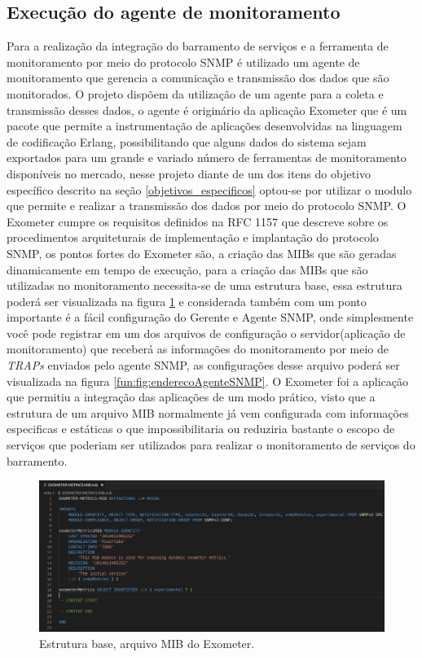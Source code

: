 \subsection{Execução do agente de monitoramento}

Para a realização da integração do barramento de serviços e a ferramenta de monitoramento por meio do protocolo \acrshort{SNMP} é utilizado um agente de monitoramento que gerencia a comunicação e transmissão dos dados que são monitorados. O projeto dispõem  da utilização de um agente para a coleta e transmissão desses dados, o agente é originário da aplicação Exometer que é um pacote que permite a instrumentação de aplicações desenvolvidas na linguagem de codificação Erlang, possibilitando que alguns dados do sistema sejam exportados para um grande e variado número de ferramentas de monitoramento disponíveis no mercado\cite{exometer_core}, nesse projeto diante de um dos itens do objetivo específico descrito na seção \ref{objetivos_especificos} optou-se por utilizar o modulo que permite e realizar a transmissão dos dados por meio do protocolo \acrshort{SNMP}. O Exometer cumpre os requisitos definidos na \acrshort{RFC} 1157 que descreve sobre os procedimentos arquiteturais de implementação e implantação do protocolo \acrshort{SNMP}, os pontos fortes do Exometer são, a criação das \acrshort{MIBs} que são geradas dinamicamente em tempo de execução, para a criação das \acrshort{MIBs} que são utilizadas no monitoramento necessita-se de uma estrutura base, essa estrutura poderá ser visualizada na figura \ref{fun:fig:MIBSNMP} e considerada também com um ponto importante é a fácil configuração do Gerente e Agente \acrshort{SNMP}, onde simplesmente você pode registrar em um dos arquivos de configuração o servidor(aplicação de monitoramento) que receberá as informações do monitoramento por meio de \textit{TRAPs} enviados pelo agente \acrshort{SNMP}, as configurações desse arquivo poderá ser visualizada na figura \ref{fun:fig:enderecoAgenteSNMP}. O Exometer foi a aplicação que permitiu a integração das aplicações de um modo prático, visto que a estrutura de um arquivo MIB normalmente já vem configurada com informações especificas e estáticas o que impossibilitaria ou reduziria bastante o escopo de serviços que poderiam ser utilizados para realizar o monitoramento de serviços do barramento. 

\begin{figure}[h!]
	\begin{center}
	\includegraphics[scale = 0.50]{img/MIBSNMP.png}
	\caption{Estrutura base, arquivo MIB do Exometer.}
	\label{fun:fig:MIBSNMP}
	\end{center}
\end{figure}

